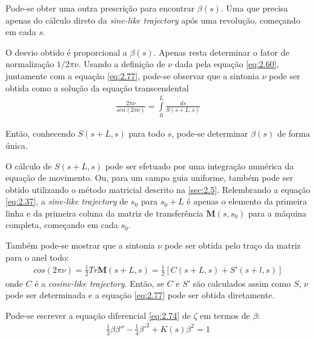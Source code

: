 Pode-se obter uma outra prescrição para encontrar $\beta(s)$. Uma que precisa apenas do cálculo direto da \textit{sine-like trajectory} após uma revolução, começando em cada $s$.

O desvio obtido é proporcional a $\beta(s)$. Apenas resta determinar o fator de normalização $1/2\pi\nu$. Usando a definição de $\nu$ dada pela equação \eqref{eq:2.60}, juntamente com a equação \eqref{eq:2.77}, pode-se observar que a sintonia $\nu$ pode ser obtida como a solução da equação transcendental
\begin{align}
	\frac{2\pi\nu}{sen(2\pi\nu)} = \int\limits_{0}^{L} \frac{ds}{S(s+L,s)}
\end{align}

Então, conhecendo $S(s+L,s)$ para todo $s$, pode-se determinar $\beta(s)$ de forma única.

O cálculo de $S(s+L,s)$ pode ser efetuado por uma integração numérica da equação de movimento. Ou, para um campo guia uniforme, também pode ser obtido utilizando o método matricial descrito na \autoref{sec:2.5}. Relembrando a equação \eqref{eq:2.37}, a \textit{sine-like trajectory} de $s_0$ para $s_0+L$ é apenas o elemento da primeira linha e da primeira coluna da matriz de transferência $\boldsymbol{M}(s,s_0)$ para a máquina completa, começando em cada $s_0$.

Também pode-se mostrar que a sintonia $\nu$ pode ser obtida pelo traço da matriz para o anel todo:
\begin{align}
	cos(2\pi\nu) = \frac{1}{2} Tr \boldsymbol{M}(s+L,s) = \frac{1}{2}[C(s+L,s) + S'(s+l,s)]
\end{align}
onde $C$ é a \textit{cosine-like trajectory}. Então, se $C$ e $S'$ são calculados assim como $S$, $\nu$ pode ser determinada e a equação \eqref{eq:2.77} pode ser obtida diretamente.

Pode-se escrever a equação diferencial \eqref{eq:2.74} de $\zeta$ em termos de $\beta$:
\begin{align}
	\frac{1}{2}\beta\beta'' - \frac{1}{4}\beta'^2 + K(s)\beta^2 = 1\label{eq:2.80}
\end{align}

